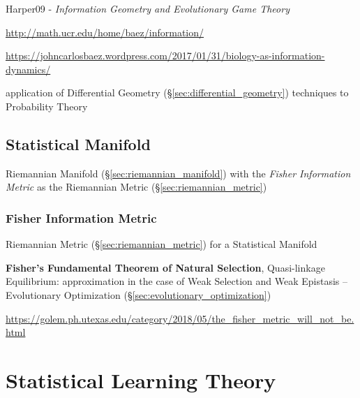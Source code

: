 Harper09 - \emph{Information Geometry and Evolutionary Game Theory}

\url{http://math.ucr.edu/home/baez/information/}

\url{https://johncarlosbaez.wordpress.com/2017/01/31/biology-as-information-dynamics/}

application of Differential Geometry
(\S\ref{sec:differential_geometry}) techniques to Probability Theory



\subsection{Statistical Manifold}\label{sec:statistical_manifold}

Riemannian Manifold (\S\ref{sec:riemannian_manifold}) with the
\emph{Fisher Information Metric} as the Riemannian Metric
(\S\ref{sec:riemannian_metric})



\subsubsection{Fisher Information Metric}\label{sec:fisher_metric}

Riemannian Metric (\S\ref{sec:riemannian_metric}) for a Statistical
Manifold

\fist \textbf{Fisher's Fundamental Theorem of Natural Selection},
Quasi-linkage Equilibrium: approximation in the case of Weak Selection
and Weak Epistasis -- Evolutionary Optimization
(\S\ref{sec:evolutionary_optimization}) %

\url{https://golem.ph.utexas.edu/category/2018/05/the_fisher_metric_will_not_be.html}



\section{Statistical Learning Theory}\label{sec:statistical_learning_theory}




